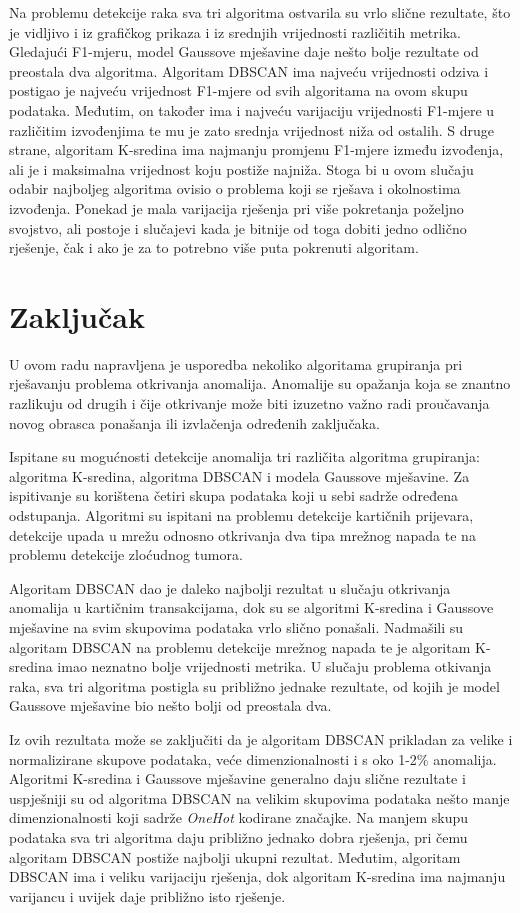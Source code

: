\documentclass[utf8, diplomski, numeric]{fer}
\begin{document}
Na problemu detekcije raka sva tri algoritma ostvarila su vrlo slične rezultate,  što je vidljivo i iz grafičkog prikaza i iz srednjih vrijednosti različitih metrika. Gledajući F1-mjeru, model Gaussove mješavine daje nešto bolje rezultate od preostala dva algoritma. Algoritam DBSCAN ima najveću vrijednosti odziva i postigao je najveću vrijednost F1-mjere od svih algoritama na ovom skupu podataka. Međutim, on također ima i najveću varijaciju vrijednosti F1-mjere u različitim izvođenjima te mu je zato srednja vrijednost niža od ostalih. S druge strane, algoritam K-sredina ima najmanju promjenu F1-mjere između izvođenja, ali je i maksimalna vrijednost koju postiže najniža. Stoga bi u ovom slučaju odabir najboljeg algoritma ovisio o problema koji se rješava i okolnostima izvođenja. Ponekad je mala varijacija rješenja pri više pokretanja poželjno svojstvo, ali postoje i slučajevi kada je bitnije od toga dobiti jedno odlično rješenje, čak i ako je za to potrebno više puta pokrenuti algoritam.

\chapter{Zaključak}
U ovom radu napravljena je usporedba nekoliko algoritama grupiranja pri rješavanju problema otkrivanja anomalija. Anomalije su opažanja koja se znantno razlikuju od drugih i čije otkrivanje može biti izuzetno važno radi proučavanja novog obrasca ponašanja ili izvlačenja određenih zaključaka.

Ispitane su mogućnosti detekcije anomalija tri različita algoritma grupiranja: algoritma K-sredina, algoritma DBSCAN i modela Gaussove mješavine. Za ispitivanje su korištena četiri skupa podataka koji u sebi sadrže određena odstupanja. Algoritmi su ispitani na problemu detekcije kartičnih prijevara, detekcije upada u mrežu odnosno otkrivanja dva tipa mrežnog napada te na problemu detekcije zloćudnog tumora.

Algoritam DBSCAN dao je daleko najbolji rezultat u slučaju otkrivanja anomalija u kartičnim transakcijama, dok su se algoritmi K-sredina i Gaussove mješavine na svim skupovima podataka vrlo slično ponašali. Nadmašili su algoritam DBSCAN na problemu detekcije mrežnog napada te je algoritam K-sredina imao neznatno bolje vrijednosti metrika. U slučaju problema otkivanja raka, sva tri algoritma postigla su približno jednake rezultate, od kojih je model Gaussove mješavine bio nešto bolji od preostala dva.

Iz ovih rezultata može se zaključiti da je algoritam DBSCAN prikladan za velike i normalizirane skupove podataka, veće dimenzionalnosti i s oko 1-2\% anomalija. Algoritmi K-sredina i Gaussove mješavine generalno daju slične rezultate i uspješniji su od algoritma DBSCAN na velikim skupovima podataka nešto manje dimenzionalnosti koji sadrže \textit{OneHot} kodirane značajke. Na manjem skupu podataka sva tri algoritma daju približno jednako dobra rješenja, pri čemu algoritam DBSCAN postiže najbolji ukupni rezultat. Međutim, algoritam DBSCAN ima i veliku varijaciju rješenja, dok algoritam K-sredina ima najmanju varijancu i uvijek daje približno isto rješenje.
\end{document}
